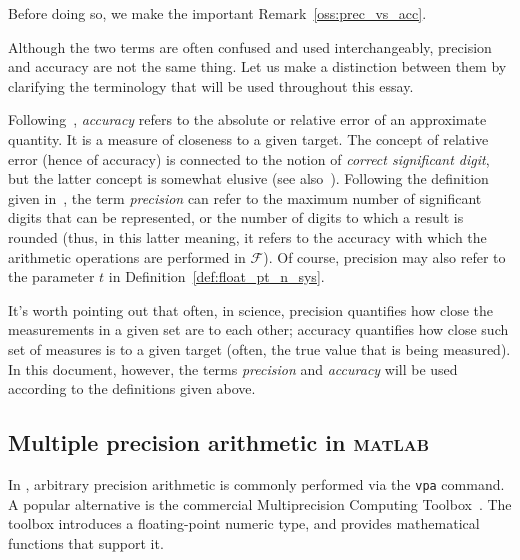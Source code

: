 Before doing so, we make the important Remark~\ref{oss:prec_vs_acc}.
\begin{oss}\label{oss:prec_vs_acc}
	Although the two terms are often confused and used interchangeably, precision and accuracy are not the same thing. Let us make a distinction between them by clarifying the terminology that will be used throughout this essay.
	
	Following~\cite[§~1.4]{higham:accuracy_book}, \emph{accuracy} refers to the absolute or relative error of an approximate quantity. It is a measure of closeness to a given target. The concept of relative error (hence of accuracy) is connected to the notion of \emph{correct significant digit}, but the latter concept is somewhat elusive (see also~\cite[§~1.2]{higham:accuracy_book}).
	Following the definition given in~\cite{article:IEEE754_2019}, the term \emph{precision} can refer to the maximum number of significant digits that can be represented, or the number of digits to which a result is rounded (thus, in this latter meaning, it refers to the accuracy with which the arithmetic operations are performed in $\mathcal{F}$). Of course, precision may also refer to the parameter $t$ in Definition~\ref{def:float_pt_n_sys}.
\end{oss}

It's worth pointing out that often, in science, precision quantifies how close the measurements in a given set are to each other; accuracy quantifies how close such set of measures is to a given target (often, the true value that is being measured). In this document, however, the terms \emph{precision} and \emph{accuracy} will be used according to the definitions given above.


\subsection{Multiple precision arithmetic in \textsc{matlab}}
In \matlab{}, arbitrary precision arithmetic is commonly performed via the \texttt{vpa} command. A popular alternative is the commercial Multiprecision Computing Toolbox~\cite{matlab_mpct}. The toolbox introduces a floating-point numeric type, and provides mathematical functions that support it.


